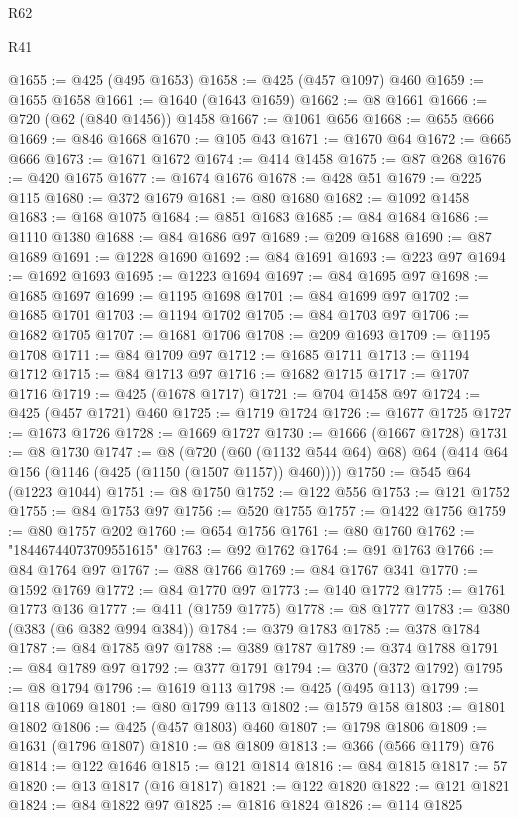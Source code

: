 \begin{lexlean}{R62}
\begin{lexlean}{R41}
\begin{coremodule}
{{{{{{{{{{{{{{{{{{{{{{{{{{{{{{{{{{{{{{{{{{{{{{{{{{{{{{{{{{{{{{{{{{{{{{{{{{{{{{{{{{{{{{{@1655 := @425 (@495 @1653)
@1658 := @425 (@457 @1097) @460
@1659 := @1655 @1658
@1661 := @1640 (@1643 @1659)
@1662 := @8 @1661
@1666 := @720 (@62 (@840 @1456)) @1458
@1667 := @1061 @656
@1668 := @655 @666
@1669 := @846 @1668
@1670 := @105 @43
@1671 := @1670 @64
@1672 := @665 @666
@1673 := @1671 @1672
@1674 := @414 @1458
@1675 := @87 @268
@1676 := @420 @1675
@1677 := @1674 @1676
@1678 := @428 @51
@1679 := @225 @115
@1680 := @372 @1679
@1681 := @80 @1680
@1682 := @1092 @1458
@1683 := @168 @1075
@1684 := @851 @1683
@1685 := @84 @1684
@1686 := @1110 @1380
@1688 := @84 @1686 @97
@1689 := @209 @1688
@1690 := @87 @1689
@1691 := @1228 @1690
@1692 := @84 @1691
@1693 := @223 @97
@1694 := @1692 @1693
@1695 := @1223 @1694
@1697 := @84 @1695 @97
@1698 := @1685 @1697
@1699 := @1195 @1698
@1701 := @84 @1699 @97
@1702 := @1685 @1701
@1703 := @1194 @1702
@1705 := @84 @1703 @97
@1706 := @1682 @1705
@1707 := @1681 @1706
@1708 := @209 @1693
@1709 := @1195 @1708
@1711 := @84 @1709 @97
@1712 := @1685 @1711
@1713 := @1194 @1712
@1715 := @84 @1713 @97
@1716 := @1682 @1715
@1717 := @1707 @1716
@1719 := @425 (@1678 @1717)
@1721 := @704 @1458 @97
@1724 := @425 (@457 @1721) @460
@1725 := @1719 @1724
@1726 := @1677 @1725
@1727 := @1673 @1726
@1728 := @1669 @1727
@1730 := @1666 (@1667 @1728)
@1731 := @8 @1730
@1747 := @8
    (@720 (@60 (@1132 @544 @64) @68) @64 (@414 @64 @156 (@1146 (@425 (@1150 (@1507 @1157)) @460))))
@1750 := @545 @64 (@1223 @1044)
@1751 := @8 @1750
@1752 := @122 @556
@1753 := @121 @1752
@1755 := @84 @1753 @97
@1756 := @520 @1755
@1757 := @1422 @1756
@1759 := @80 @1757 @202
@1760 := @654 @1756
@1761 := @80 @1760
@1762 := "18446744073709551615"
@1763 := @92 @1762
@1764 := @91 @1763
@1766 := @84 @1764 @97
@1767 := @88 @1766
@1769 := @84 @1767 @341
@1770 := @1592 @1769
@1772 := @84 @1770 @97
@1773 := @140 @1772
@1775 := @1761 @1773 @136
@1777 := @411 (@1759 @1775)
@1778 := @8 @1777
@1783 := @380 (@383 (@6 @382 @994 @384))
@1784 := @379 @1783
@1785 := @378 @1784
@1787 := @84 @1785 @97
@1788 := @389 @1787
@1789 := @374 @1788
@1791 := @84 @1789 @97
@1792 := @377 @1791
@1794 := @370 (@372 @1792)
@1795 := @8 @1794
@1796 := @1619 @113
@1798 := @425 (@495 @113)
@1799 := @118 @1069
@1801 := @80 @1799 @113
@1802 := @1579 @158
@1803 := @1801 @1802
@1806 := @425 (@457 @1803) @460
@1807 := @1798 @1806
@1809 := @1631 (@1796 @1807)
@1810 := @8 @1809
@1813 := @366 (@566 @1179) @76
@1814 := @122 @1646
@1815 := @121 @1814
@1816 := @84 @1815
@1817 := 57
@1820 := @13 @1817 (@16 @1817)
@1821 := @122 @1820
@1822 := @121 @1821
@1824 := @84 @1822 @97
@1825 := @1816 @1824
@1826 := @114 @1825
}}}}}}}}}}}}}}}}}}}}}}}}}}}}}}}}}}}}}}}}}}}}}}}}}}}}}}}}}}}}}}}}}}}}}}}}}}}}}}}}}}}}}}}
\end{coremodule}
\end{lexlean}
\end{lexlean}
